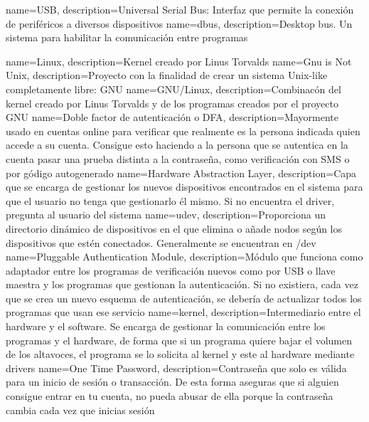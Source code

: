\makeglossaries


{
	name=USB,
	description={Universal Serial Bus: Interfaz que permite la conexión de periféricos a diversos dispositivos}
}
{
	name=dbus,
	description={Desktop bus. Un sistema para habilitar la comunicación entre programas}
}

{
	name=Linux,
	description={Kernel creado por Linus Torvalds}
}
{
	name=Gnu is Not Unix,
	description={Proyecto con la finalidad de crear un sistema Unix-like completamente libre: GNU}
}
{
	name=GNU/Linux,
	description={Combinacón del kernel creado por Linus Torvalds y de los programas creados por el proyecto GNU}
}
{
	name=Doble factor de autenticación o DFA,
	description={Mayormente usado en cuentas online para verificar que realmente es la persona indicada quien accede a su cuenta. Consigue esto haciendo a la persona que se autentica en la cuenta pasar una prueba distinta a la contraseña, como verificación con SMS o por gódigo autogenerado}
}
{
	name=Hardware Abstraction Layer,
	description={Capa que se encarga de gestionar los nuevos dispositivos encontrados en el sistema para que el usuario no tenga que gestionarlo él mismo. Si no encuentra el driver, pregunta al usuario del sistema}
}
{
	name=udev,
	description={Proporciona un directorio dinámico de dispositivos en el que elimina o añade nodos según los dispositivos que estén conectados. Generalmente se encuentran en /dev}
}
{
	name=Pluggable Authentication Module,
	description={Módulo que funciona como adaptador entre los programas de verificación nuevos como por USB o llave maestra y los programas que gestionan la autenticación. Si no existiera, cada vez que se crea un nuevo esquema de autenticación, se debería de actualizar todos los programas que usan ese servicio}
}
{
	name=kernel,
	description={Intermediario entre el hardware y el software. Se encarga de gestionar la comunicación entre los programas y el hardware, de forma que si un programa quiere bajar el volumen de los altavoces, el programa se lo solicita al kernel y este al hardware mediante drivers}
}
{
	name=One Time Password,
	description={Contraseña que solo es válida para un inicio de sesión o transacción. De esta forma aseguras que si alguien consigue entrar en tu cuenta, no pueda abusar de ella porque la contraseña cambia cada vez que inicias sesión}
}
